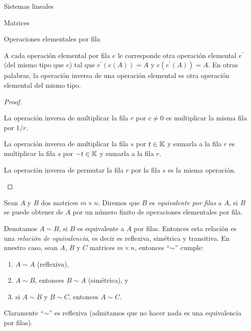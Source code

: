 \begin{chapter}{Sistemas lineales}
\begin{section}{Matrices}
\begin{subsection}{Operaciones elementales por fila}
                \begin{teorema}\label{op-elem}
                    A cada operación elemental por fila $e$ le corresponde otra operación elemental $e^\prime$ (del mismo tipo que $e$) tal que $e^\prime(e(A)) = A$ y $e(e^\prime(A)) = A$. En otras palabras, la operación inversa de una operación elemental es otra operación elemental del mismo tipo.  
                \end{teorema}
                \begin{proof} \
                    \begin{enumelem}
                        \item La operación inversa de multiplicar la fila $r$ por $c\not=0$ es multiplicar la misma fila por $1/r$.
                        \item La operación inversa de multiplicar la fila $s$ por  $t \in \mathbb K$ y sumarla a la fila $r$ es multiplicar  la fila $s$ por  $-t \in \mathbb K$ y sumarla a la fila $r$.
                        \item La operación inversa de permutar la fila $r$ por la fila $s$ es la misma operación.
                    \end{enumelem}
                \end{proof}
                
                \begin{definicion} 
                    Sean $A$ y $B$ dos matrices $m \times n$. Diremos que $B$ es \textit{equivalente por filas} a $A$, si $B$ se puede obtener de $A$ por un número finito de operaciones elementales por fila. 
                \end{definicion}
            

                \begin{obs*} Denotamos $A \sim B$, si $B$ es equivalente a $A$ por filas. Entonces esta relación es una \textit{relación de equivalencia}, es decir es reflexiva, simétrica y transitiva. En  nuestro caso, sean $A$, $B$ y $C$ matrices $m \times n$, entonces ``$\sim$'' cumple: 
                    \begin{enumerate}
                        \item  $A \sim A$ (reflexiva), 
                        \item $A \sim B$, entonces $B \sim A$ (simétrica), y
                        \item si $A \sim B$ y $B \sim C$, entonces $A \sim C$.   
                    \end{enumerate}
                    Claramente ``$\sim$'' es reflexiva (admitamos que no hacer nada es una equivalencia por filas). 
                    

\end{obs*}
\end{subsection}
\end{section}
\end{chapter}

